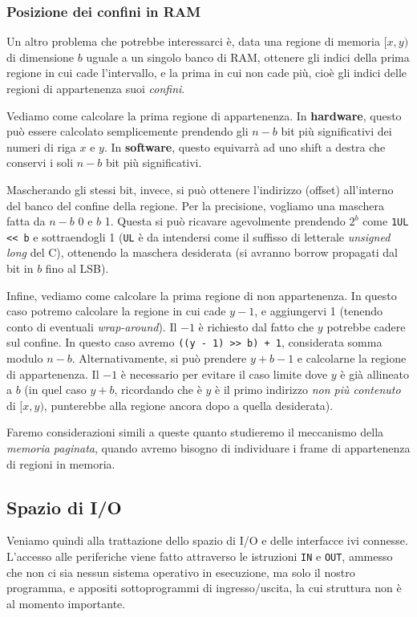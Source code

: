 \documentclass[a4paper,11pt]{article}
\begin{document}
\subsubsection{Posizione dei confini in RAM}
Un altro problema che potrebbe interessarci è, data una regione di memoria $[x, y)$ di dimensione $b$ uguale a un singolo banco di RAM, ottenere gli indici della prima regione in cui cade l'intervallo, e la prima in cui non cade più, cioè gli indici delle regioni di appartenenza suoi \textit{confini}.

Vediamo come calcolare la prima regione di appartenenza.
In \textbf{hardware}, questo può essere calcolato semplicemente prendendo gli $n - b$ bit più significativi dei numeri di riga $x$ e $y$.
In \textbf{software}, questo equivarrà ad uno shift a destra che conservi i soli $n-b$ bit più significativi.

Mascherando gli stessi bit, invece, si può ottenere l'indirizzo (offset) all'interno del banco del confine della regione.
Per la precisione, vogliamo una maschera fatta da $n - b$ 0 e $b$ 1.
Questa si può ricavare agevolmente prendendo $2^b$ come \lstinline|1UL << b| e sottraendogli 1 (\lstinline|UL| è da intendersi come il suffisso di letterale \textit{unsigned long} del C), ottenendo la maschera desiderata (si avranno borrow propagati dal bit in $b$ fino al LSB).

Infine, vediamo come calcolare la prima regione di non appartenenza.
In questo caso potremo calcolare la regione in cui cade $y - 1$, e aggiungervi 1 (tenendo conto di eventuali \textit{wrap-around}). Il $-1$ è richiesto dal fatto che $y$ potrebbe cadere sul confine.
In questo caso avremo \lstinline|((y - 1) >> b) + 1|, considerata somma modulo $n - b$.
Alternativamente, si può prendere $y + b - 1$ e calcolarne la regione di appartenenza. Il $-1$ è necessario per evitare il caso limite dove $y$ è già allineato a $b$ (in quel caso $y + b$, ricordando che è $y$ è il primo indirizzo \textit{non più contenuto} di $[x, y)$, punterebbe alla regione ancora dopo a quella desiderata).

Faremo considerazioni simili a queste quanto studieremo il meccanismo della \textit{memoria paginata}, quando avremo bisogno di individuare i frame di appartenenza di regioni in memoria.

\subsection{Spazio di I/O}
Veniamo quindi alla trattazione dello spazio di I/O e delle interfacce ivi connesse.
L'accesso alle periferiche viene fatto attraverso le istruzioni \lstinline|IN| e \lstinline|OUT|, ammesso che non ci sia nessun sistema operativo in esecuzione, ma solo il nostro programma, e appositi sottoprogrammi di ingresso/uscita, la cui struttura non è al momento importante.
\end{document}
